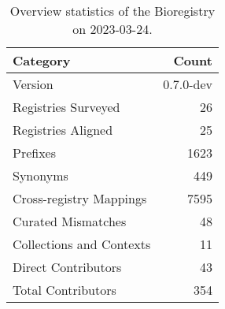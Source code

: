 \begin{table}
\centering
\caption{Overview statistics of the Bioregistry on 2023-03-24.}
\label{tab:bioregistry-summary}
\begin{tabular}{lr}
\toprule
                Category &     Count \\
\midrule
                 Version & 0.7.0-dev \\
     Registries Surveyed &        26 \\
      Registries Aligned &        25 \\
                Prefixes &      1623 \\
                Synonyms &       449 \\
 Cross-registry Mappings &      7595 \\
      Curated Mismatches &        48 \\
Collections and Contexts &        11 \\
     Direct Contributors &        43 \\
      Total Contributors &       354 \\
\bottomrule
\end{tabular}
\end{table}
